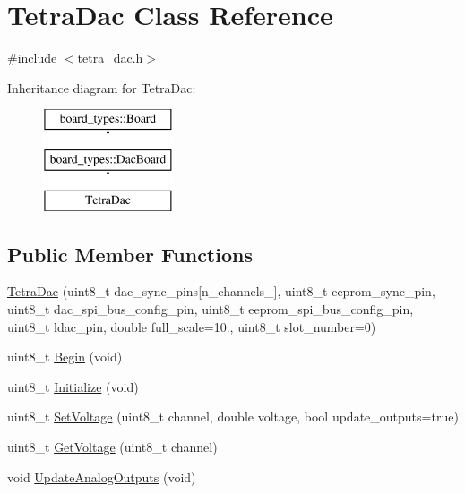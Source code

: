 \hypertarget{classTetraDac}{}\section{Tetra\+Dac Class Reference}
\label{classTetraDac}


{\ttfamily \#include $<$tetra\+\_\+dac.\+h$>$}

Inheritance diagram for Tetra\+Dac\+:\begin{figure}[H]
\begin{center}
\leavevmode
\includegraphics[height=3.000000cm]{classTetraDac}
\end{center}
\end{figure}
\subsection*{Public Member Functions}
\begin{DoxyCompactItemize}
\item 
\mbox{\hyperlink{classTetraDac_a77131270e115bf47b6c582d53cddb881}{Tetra\+Dac}} (uint8\+\_\+t dac\+\_\+sync\+\_\+pins\mbox{[}n\+\_\+channels\+\_\+\mbox{]}, uint8\+\_\+t eeprom\+\_\+sync\+\_\+pin, uint8\+\_\+t dac\+\_\+spi\+\_\+bus\+\_\+config\+\_\+pin, uint8\+\_\+t eeprom\+\_\+spi\+\_\+bus\+\_\+config\+\_\+pin, uint8\+\_\+t ldac\+\_\+pin, double full\+\_\+scale=10., uint8\+\_\+t slot\+\_\+number=0)
\item 
uint8\+\_\+t \mbox{\hyperlink{classTetraDac_aeee47156d6a403ccbb8183b02cca798d}{Begin}} (void)
\item 
uint8\+\_\+t \mbox{\hyperlink{classTetraDac_a57fd4d8db59603efe74c0c3902c64ae9}{Initialize}} (void)
\item 
uint8\+\_\+t \mbox{\hyperlink{classTetraDac_a265bed4317bb6b3b4c6962fa538631da}{Set\+Voltage}} (uint8\+\_\+t channel, double voltage, bool update\+\_\+outputs=true)
\item 
uint8\+\_\+t \mbox{\hyperlink{classTetraDac_a6a5206bc2e525ea820a1b3279526850c}{Get\+Voltage}} (uint8\+\_\+t channel)
\item 
void \mbox{\hyperlink{classTetraDac_ae7e2c1afbc64a8cc0ddd2ef4af0b25b3}{Update\+Analog\+Outputs}} (void)
\end{DoxyCompactItemize}


